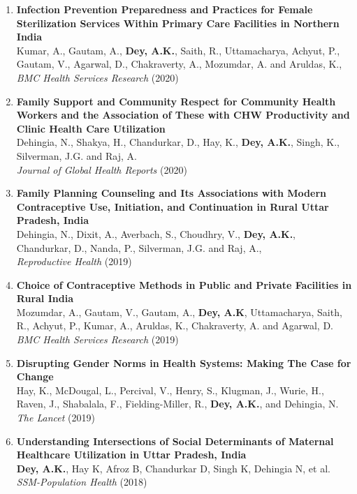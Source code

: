 \documentclass[13pt,letterpaper]{article}
\begin{document}
\begin{enumerate}
\item \textbf{Infection Prevention Preparedness and Practices for Female Sterilization Services Within Primary Care Facilities in Northern India}\\
Kumar, A., Gautam, A., \textbf{Dey, A.K.}, Saith, R., Uttamacharya, Achyut, P., Gautam, V., Agarwal, D., Chakraverty, A., Mozumdar, A. and Aruldas, K.,\\
\emph{BMC Health Services Research} (2020) 

\item \textbf{Family Support and Community Respect for Community Health Workers and the Association of These with CHW Productivity and Clinic Health Care Utilization}\\
Dehingia, N., Shakya, H., Chandurkar, D., Hay, K., \textbf{Dey, A.K.}, Singh, K., Silverman, J.G. and Raj, A.\\
\emph{Journal of Global Health Reports} (2020) 

\item \textbf{Family Planning Counseling and Its Associations with Modern Contraceptive Use, Initiation, and Continuation in Rural Uttar Pradesh, India}\\
Dehingia, N., Dixit, A., Averbach, S., Choudhry, V., \textbf{Dey, A.K.}, Chandurkar, D., Nanda, P., Silverman, J.G. and Raj, A.,\\
\emph{Reproductive Health} (2019) 

\item \textbf{Choice of Contraceptive Methods in Public and Private Facilities in Rural India}\\
Mozumdar, A., Gautam, V., Gautam, A., \textbf{Dey, A.K}, Uttamacharya, Saith, R., Achyut, P., Kumar, A., Aruldas, K., Chakraverty, A. and Agarwal, D.\\
\emph{BMC Health Services Research} (2019) 

\item \textbf{Disrupting Gender Norms in Health Systems: Making The Case for Change}\\
Hay, K., McDougal, L., Percival, V., Henry, S., Klugman, J., Wurie, H., Raven, J., Shabalala, F., Fielding-Miller, R., \textbf{Dey, A.K.}, and Dehingia, N.\\
\emph{The Lancet} (2019) 

\item \textbf{Understanding Intersections of Social Determinants of Maternal Healthcare Utilization in Uttar Pradesh, India}\\
\textbf{Dey, A.K.}, Hay K, Afroz B, Chandurkar D, Singh K, Dehingia N, et al.\\
\emph{SSM-Population Health} (2018) 


\end{enumerate}
\end{document}
